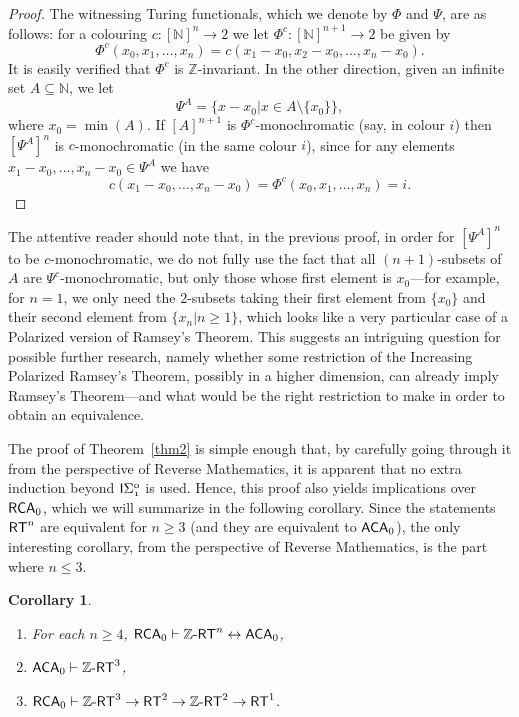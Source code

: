 \documentclass[11pt]{amsart}
\newcommand{\rt}{\mathnormal{\mathsf{RT}}}
\newcommand{\zrt}{\mathnormal{\mathbb Z\text{-}\mathsf{RT}}}
\newcommand{\rca}{\mathnormal{\mathsf{RCA}}_0}
\newcommand{\aca}{\mathnormal{\mathsf{ACA}}_0}
\newcommand{\isigma}{\mathnormal{\mathsf{I}\mathrm{\Sigma}_1^0}}
\newtheorem{corollary}[theorem]{Corollary}
\theoremstyle{definition}
\begin{document}
\begin{proof}
The witnessing Turing functionals, which we denote by $\Phi$ and $\Psi$, are as follows: for a colouring $c:[\mathbb N]^n\longrightarrow 2$ we let $\Phi^c:[\mathbb N]^{n+1}\longrightarrow 2$ be given by
\begin{equation*}
\Phi^c(x_0,x_1,\ldots,x_n)=c(x_1-x_0,x_2-x_0,\ldots,x_n-x_0).
\end{equation*}
It is easily verified that $\Phi^c$ is $\mathbb Z$-invariant. In the other direction, given an infinite set $A\subseteq\mathbb N$, we let
\begin{equation*}
\Psi^A=\{x-x_0\big|x\in A\setminus\{x_0\}\},
\end{equation*}
where $x_0=\min(A)$. If $[A]^{n+1}$ is $\Phi^c$-monochromatic (say, in colour $i$) then $[\Psi^A]^n$ is $c$-monochromatic (in the same colour $i$), since for any elements $x_1-x_0,\ldots,x_n-x_0\in \Psi^A$ we have
\begin{equation*}
c(x_1-x_0,\ldots,x_n-x_0)=\Phi^c(x_0,x_1,\ldots,x_n)=i.
\end{equation*}
\end{proof}

The attentive reader should note that, in the previous proof, in order for $[\Psi^A]^n$ to be $c$-monochromatic, we do not fully use the fact that all $(n+1)$-subsets of $A$ are $\Psi^c$-monochromatic, but only those whose first element is $x_0$---for example, for $n=1$, we only need the $2$-subsets taking their first element from $\{x_0\}$ and their second element from $\{x_n\big|n\geq 1\}$, which looks like a very particular case of a Polarized version of Ramsey's Theorem. This suggests an intriguing question for possible further research, namely whether some restriction of the Increasing Polarized Ramsey's Theorem, possibly in a higher dimension, can already imply Ramsey's Theorem---and what would be the right restriction to make in order to obtain an equivalence.

The proof of Theorem~\ref{thm2} is simple enough that, by carefully going through it from the perspective of Reverse Mathematics, it is apparent that no extra induction beyond $\isigma$ is used. Hence, this proof also yields implications over $\rca$, which we will summarize in the following corollary. Since the statements $\rt^n$ are equivalent for $n\geq 3$ (and they are equivalent to $\aca$), the only interesting corollary, from the perspective of Reverse Mathematics, is the part where $n\leq 3$.

\begin{corollary}\label{cor:implicaciones-reverse}
\hfill
\begin{enumerate}
\item For each $n\geq 4$, $\rca\vdash\zrt^n\leftrightarrow\aca$,
\item $\aca\vdash\zrt^3$,
\item $\rca\vdash\zrt^3\rightarrow\rt^2\rightarrow\zrt^2\rightarrow\rt^1$.
\end{enumerate}
\end{corollary}
\end{document}

